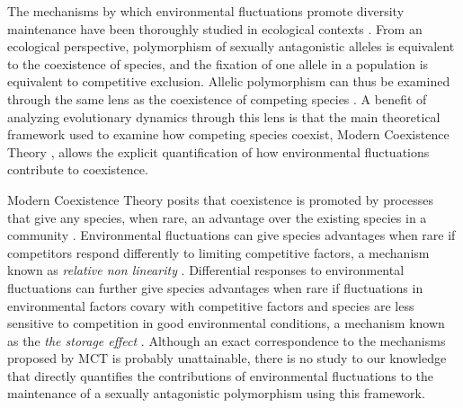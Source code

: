 \documentclass[12pt]{article}
\begin{document}
The mechanisms by which environmental fluctuations promote diversity maintenance have been thoroughly studied in ecological contexts \citep{levins1979coexistence,armstrong1980competitive,chesson2000general,barabas_chessons_2018}. From an ecological perspective, polymorphism of sexually antagonistic alleles is equivalent to the coexistence of species, and the fixation of one allele in a population is equivalent to competitive exclusion. Allelic polymorphism can thus be examined through the same lens as the coexistence of competing species \citep{ellner1994role,ellner1996patterns,dean2005protecting,schreiber2010interactive}. A benefit of analyzing evolutionary dynamics through this lens is that the main theoretical framework used to examine how competing species coexist, Modern Coexistence Theory \citep{Chesson2000, barabas_chessons_2018}, allows the explicit quantification of how environmental fluctuations contribute to coexistence.

Modern Coexistence Theory posits that coexistence is promoted by processes that give any species, when rare, an advantage over the existing species in a community \citep{chesson1994multispecies,Chesson2000}. Environmental fluctuations can give species advantages when rare if competitors respond differently to limiting competitive factors, a mechanism known as \textit{relative non linearity} \citep{chesson2000general,ellner2016quantify,zepeda2019fluctuation}. Differential responses to environmental fluctuations can further give species advantages when rare if fluctuations in environmental factors covary with competitive factors and species are less sensitive to competition in good environmental conditions, a mechanism known as the \textit{the storage effect} \citep{Chesson2000,ellner2016quantify,barabas_chessons_2018,schreiber2021positively}. Although an exact correspondence to the mechanisms proposed by MCT is probably unattainable, there is no study to our knowledge that directly quantifies the contributions of environmental fluctuations to the maintenance of a sexually antagonistic polymorphism using this framework.

\end{document}
